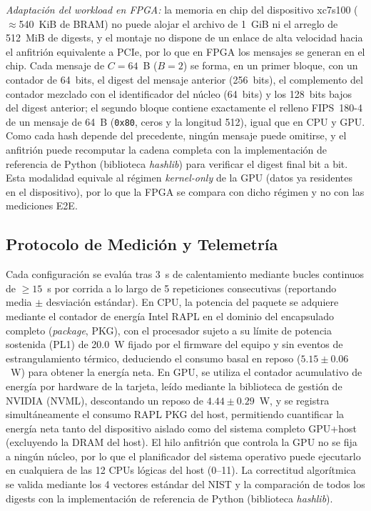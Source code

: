 \documentclass[conference]{IEEEtran}
\begin{document}
\textit{Adaptación del workload en FPGA:}\label{sec:workload_fpga} la memoria en chip del dispositivo xc7s100 ($\approx$540~KiB de BRAM) no puede alojar el archivo de 1~GiB ni el arreglo de 512~MiB de digests, y el montaje no dispone de un enlace de alta velocidad hacia el anfitrión equivalente a PCIe, por lo que en FPGA los mensajes se generan en el chip. Cada mensaje de $C=64$~B ($B=2$) se forma, en un primer bloque, con un contador de 64~bits, el digest del mensaje anterior (256~bits), el complemento del contador mezclado con el identificador del núcleo (64~bits) y los 128~bits bajos del digest anterior; el segundo bloque contiene exactamente el relleno FIPS~180-4 de un mensaje de 64~B (\texttt{0x80}, ceros y la longitud 512), igual que en CPU y GPU. Como cada hash depende del precedente, ningún mensaje puede omitirse, y el anfitrión puede recomputar la cadena completa con la implementación de referencia de Python (biblioteca \textit{hashlib}) para verificar el digest final bit a bit. Esta modalidad equivale al régimen \textit{kernel-only} de la GPU (datos ya residentes en el dispositivo), por lo que la FPGA se compara con dicho régimen y no con las mediciones E2E.

\subsection{Protocolo de Medición y Telemetría}

Cada configuración se evalúa tras 3~s de calentamiento mediante bucles continuos de $\geq 15$~s por corrida a lo largo de 5 repeticiones consecutivas (reportando media $\pm$ desviación estándar). En CPU, la potencia del paquete se adquiere mediante el contador de energía Intel RAPL en el dominio del encapsulado completo (\textit{package}, PKG), con el procesador sujeto a su límite de potencia sostenida (PL1) de 20.0~W fijado por el firmware del equipo y sin eventos de estrangulamiento térmico, deduciendo el consumo basal en reposo ($5.15 \pm 0.06$~W) para obtener la energía neta. En GPU, se utiliza el contador acumulativo de energía por hardware de la tarjeta, leído mediante la biblioteca de gestión de NVIDIA (NVML), descontando un reposo de $4.44 \pm 0.29$~W, y se registra simultáneamente el consumo RAPL PKG del host, permitiendo cuantificar la energía neta tanto del dispositivo aislado como del sistema completo GPU+host (excluyendo la DRAM del host). El hilo anfitrión que controla la GPU no se fija a ningún núcleo, por lo que el planificador del sistema operativo puede ejecutarlo en cualquiera de las 12 CPUs lógicas del host (0--11). La correctitud algorítmica se valida mediante los 4 vectores estándar del NIST y la comparación de todos los digests con la implementación de referencia de Python (biblioteca \textit{hashlib}).
\end{document}
